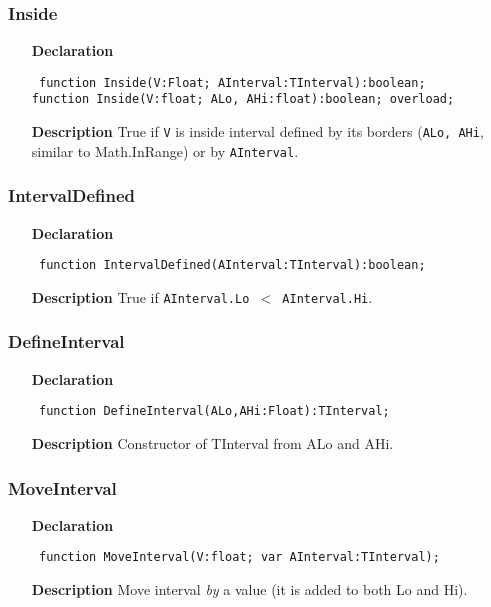 \documentclass[12pt,a4paper,oneside]{report}
\newcommand{\declarationitem}[1]{\textbf{#1}}
\newcommand{\descriptiontitle}[1]{\textbf{#1}}
\newcommand{\code}[1]{\texttt{#1}}
\begin{document}
\subsubsection{Inside}
\label{uIntervals-Inside}
\begin{itemize}\item[\declarationitem{Declaration}\hfill]
\begin{flushleft}
\code{
function Inside(V:Float; AInterval:TInterval):boolean;\\
function Inside(V:float; ALo, AHi:float):boolean; overload;}
\end{flushleft}
\item[\descriptiontitle{Description}]
True if \code{V} is inside interval defined by its borders (\code{ALo, AHi}, similar to Math.InRange) or by \code{AInterval}.
\end{itemize}

\subsubsection{IntervalDefined}
\label{uIntervals-IntervalDefined}
\begin{itemize}\item[\declarationitem{Declaration}\hfill]
\begin{flushleft}
\code{
function IntervalDefined(AInterval:TInterval):boolean;}
\end{flushleft}

\item[\descriptiontitle{Description}]
True if \code{AInterval.Lo {$<$} AInterval.Hi}.
\end{itemize}

\subsubsection{DefineInterval}
\label{uIntervals-DefineInterval}
\begin{itemize}\item[\declarationitem{Declaration}\hfill]
\begin{flushleft}
\code{
function DefineInterval(ALo,AHi:Float):TInterval;}
\end{flushleft}
\item[\descriptiontitle{Description}]
Constructor of TInterval from ALo and AHi.
\end{itemize}

\subsubsection{MoveInterval}
\label{uIntervals-MoveInterval}
\begin{itemize}\item[\declarationitem{Declaration}\hfill]
	\begin{flushleft}
		\code{
			function MoveInterval(V:float; var AInterval:TInterval);}
	\end{flushleft}
	\item[\descriptiontitle{Description}]
	Move interval \textit{by} a value (it is added to both Lo and Hi).
\end{itemize}
\end{document}
